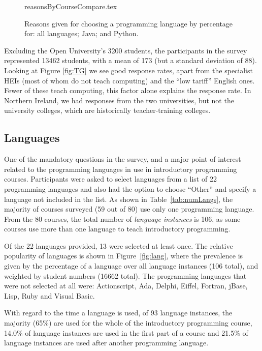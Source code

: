 \documentclass{sig-alternate}
\begin{document}
\begin{figure}
\begin{center}
{reasonsByCourseCompare.tex}
\end{center}\vskip-18pt
\caption{Reasons given for choosing a programming language by percentage for: all languages; Java; and Python.\label{fig:reasons}}
\end{figure}
\par
Excluding the Open University's 3200 students, the participants in the
survey represented 13462 students, with a mean of 173 (but a standard
deviation of 88). Looking at Figure \ref{fig:TG} we see good response
rates, apart from the specialist HEIs (most of whom do not teach
computing) and the ``low tariff'' English ones. Fewer of these teach
computing, %
this factor alone explains the response rate. In Northern Ireland, we
had responses from the two universities, but not the university
colleges, which are historically teacher-training colleges.

\subsection{Languages}


One of the mandatory questions in the survey, and a major point of interest related to the programming languages in use in introductory programming courses. Participants were asked to select languages from a list of 22 programming languages and also had the option to choose ``Other'' and specify a language not included in the list. As shown in Table~\ref{tab:numLangs}, the majority of courses surveyed (59 out of 80) use only one programming language. From the 80 courses, the total number of {\emph{language instances}} is 106, as some courses use more than one language to teach introductory programming. 


Of the 22 languages provided, 13 were selected at least once. The relative popularity of languages is shown in Figure~\ref{fig:lang}, where the prevalence is given by the percentage of a language over all language instances (106 total), and weighted by student numbers (16662 total). The programming languages that were not selected at all were: Actionscript, Ada, Delphi, Eiffel, Fortran, jBase, Lisp, Ruby and Visual Basic.

With regard to the time a language is used, of 93 language instances, the majority (65\%) are used for the whole of the introductory programming course, 14.0\% of language instances are used in the first part of a course and 21.5\% of language instances are used after another programming language.
\end{document}
